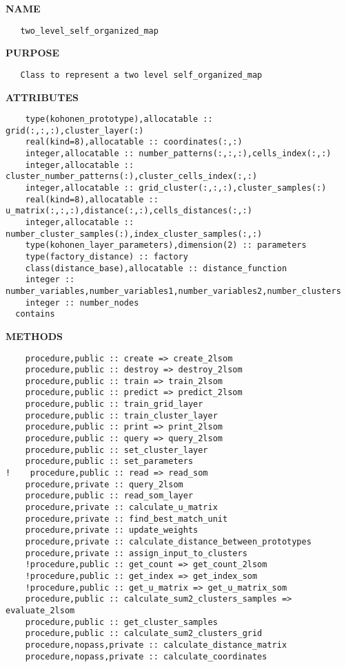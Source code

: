 \documentclass{article}
\begin{document}
\label{ch:robo80}
\label{ch:two_level_self_organized_map_utilities_two_level_self_organized_map}
\textbf{NAME}
\begin{verbatim}
   two_level_self_organized_map
\end{verbatim}
\textbf{PURPOSE}
\begin{verbatim}
   Class to represent a two level self_organized_map
\end{verbatim}
\textbf{ATTRIBUTES}
\begin{verbatim}
    type(kohonen_prototype),allocatable :: grid(:,:,:),cluster_layer(:)
    real(kind=8),allocatable :: coordinates(:,:)
    integer,allocatable :: number_patterns(:,:,:),cells_index(:,:)
    integer,allocatable :: cluster_number_patterns(:),cluster_cells_index(:,:)
    integer,allocatable :: grid_cluster(:,:,:),cluster_samples(:)
    real(kind=8),allocatable :: u_matrix(:,:,:),distance(:,:),cells_distances(:,:)
    integer,allocatable :: number_cluster_samples(:),index_cluster_samples(:,:)
    type(kohonen_layer_parameters),dimension(2) :: parameters
    type(factory_distance) :: factory
    class(distance_base),allocatable :: distance_function
    integer :: number_variables,number_variables1,number_variables2,number_clusters
    integer :: number_nodes
  contains
\end{verbatim}
\textbf{METHODS}
\begin{verbatim}
    procedure,public :: create => create_2lsom
    procedure,public :: destroy => destroy_2lsom
    procedure,public :: train => train_2lsom
    procedure,public :: predict => predict_2lsom
    procedure,public :: train_grid_layer
    procedure,public :: train_cluster_layer
    procedure,public :: print => print_2lsom
    procedure,public :: query => query_2lsom
    procedure,public :: set_cluster_layer
    procedure,public :: set_parameters
!    procedure,public :: read => read_som
    procedure,private :: query_2lsom
    procedure,public :: read_som_layer
    procedure,private :: calculate_u_matrix
    procedure,private :: find_best_match_unit
    procedure,private :: update_weights
    procedure,private :: calculate_distance_between_prototypes
    procedure,private :: assign_input_to_clusters
    !procedure,public :: get_count => get_count_2lsom
    !procedure,public :: get_index => get_index_som
    !procedure,public :: get_u_matrix => get_u_matrix_som
    procedure,public :: calculate_sum2_clusters_samples => evaluate_2lsom
    procedure,public :: get_cluster_samples
    procedure,public :: calculate_sum2_clusters_grid
    procedure,nopass,private :: calculate_distance_matrix
    procedure,nopass,private :: calculate_coordinates
\end{verbatim}
\newpage
\end{document}
